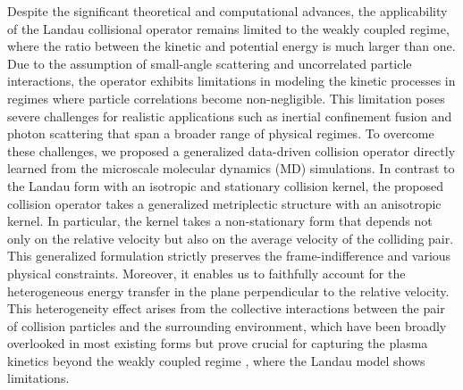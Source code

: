 \documentclass[preprint,1p,times]{elsarticle}
\theoremstyle{definition}
\theoremstyle{remark}
\begin{document}
Despite the significant theoretical and computational advances, the applicability of the Landau collisional operator remains limited to the weakly coupled regime, where the ratio between the kinetic and potential energy is much larger than one. Due to the assumption of small-angle scattering and uncorrelated particle interactions, the operator exhibits limitations in modeling the kinetic processes in regimes where particle correlations become non-negligible. This limitation poses severe challenges for realistic applications such as inertial confinement fusion \cite{Rinderknecht_kinetic_plasma_reivew_2018, Indirect_drive_ICF_PRL_1_2024} and photon scattering \cite{Dharma_Perrot_PRE_1998} that span a broader range of physical regimes. To overcome these challenges, we proposed a generalized data-driven collision operator \cite{zhao2025data} directly learned from the microscale molecular dynamics (MD) simulations. In contrast to the Landau form with an isotropic and stationary collision kernel, the proposed collision operator takes a generalized metriplectic structure \cite{morrison1986paradigm} with an anisotropic kernel. In particular, the kernel takes a non-stationary form that depends not only on the relative velocity but also on the average velocity of the colliding pair. This generalized formulation strictly preserves the frame-indifference and various physical constraints. Moreover, it enables us to faithfully account for the heterogeneous energy transfer in the plane perpendicular to the relative velocity. This heterogeneity effect arises from the collective interactions between the pair of collision particles and the surrounding environment, which have been broadly overlooked in most existing forms but prove crucial for capturing the plasma kinetics beyond the weakly coupled regime \cite{zhao2025data}, where the Landau model shows limitations.  
\end{document}
